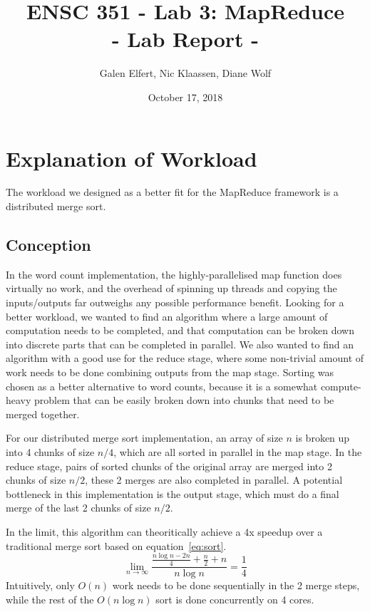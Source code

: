\documentclass[12pt, letterpaper]{article}
\begin{document}
\title{ENSC 351 - Lab 3: MapReduce\\ \large{- Lab Report -}}
\date{October 17, 2018}
\author{Galen Elfert, Nic Klaassen, Diane Wolf}
\maketitle
\section{Explanation of Workload}
	The workload we designed as a better fit for the MapReduce framework is a distributed merge sort.

\subsection{Conception}
	In the word count implementation, the highly-parallelised map function does virtually no work, and the overhead of spinning up threads and copying the inputs/outputs far outweighs any possible performance benefit.
	Looking for a better workload, we wanted to find an algorithm where a large amount of computation needs to be completed, and that computation can be broken down into discrete parts that can be completed in parallel.
	We also wanted to find an algorithm with a good use for the reduce stage, where some non-trivial amount of work needs to be done combining outputs from the map stage.
	Sorting was chosen as a better alternative to word counts, because it is a somewhat compute-heavy problem that can be easily broken down into chunks that need to be merged together.

	For our distributed merge sort implementation, an array of size $ n $ is broken up into 4 chunks of size $ n/4 $, which are all sorted in parallel in the map stage.
	In the reduce stage, pairs of sorted chunks of the original array are merged into 2 chunks of size $ n/2 $, these 2 merges are also completed in parallel.
	A potential bottleneck in this implementation is the output stage, which must do a final merge of the last 2 chunks of size $ n/2 $.

	In the limit, this algorithm can theoritically achieve a 4x speedup over a traditional merge sort based on equation~\ref{eq:sort}.
	\begin{equation} \label{eq:sort}
	\lim_{n\to\infty} \frac{\frac{n\log{n} - 2n}{4} + \frac{n}{2} + n}{n\log{n}} = \frac{1}{4}
	\end{equation}
	Intuitively, only $O(n)$ work needs to be done sequentially in the 2 merge steps, while the rest of the $O(n\log{n})$ sort is done concurrently on 4 cores.
\end{document}
